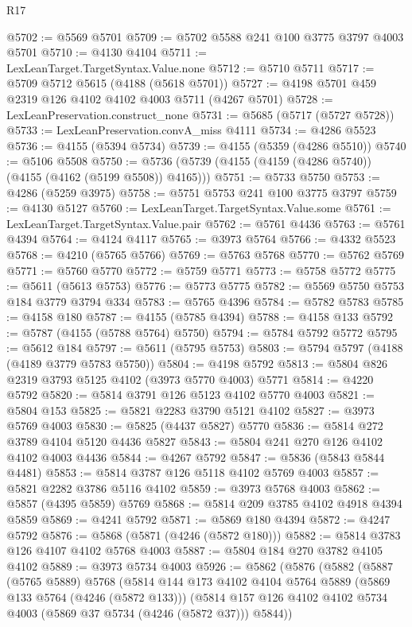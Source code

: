 \begin{lexlean}{R17}
\begin{coremodule}
@5702 := @5569 @5701
@5709 := @5702 @5588 @241 @100 @3775 @3797 @4003 @5701
@5710 := @4130 @4104
@5711 := LexLeanTarget.TargetSyntax.Value.none
@5712 := @5710 @5711
@5717 := @5709 @5712 @5615 (@4188 (@5618 @5701))
@5727 := @4198 @5701 @459 @2319 @126 @4102 @4102 @4003 @5711 (@4267 @5701)
@5728 := LexLeanPreservation.construct_none
@5731 := @5685 (@5717 (@5727 @5728))
@5733 := LexLeanPreservation.convA_miss @4111
@5734 := @4286 @5523
@5736 := @4155 (@5394 @5734)
@5739 := @4155 (@5359 (@4286 @5510))
@5740 := @5106 @5508
@5750 := @5736 (@5739 (@4155 (@4159 (@4286 @5740)) (@4155 (@4162 (@5199 @5508)) @4165)))
@5751 := @5733 @5750
@5753 := @4286 (@5259 @3975)
@5758 := @5751 @5753 @241 @100 @3775 @3797
@5759 := @4130 @5127
@5760 := LexLeanTarget.TargetSyntax.Value.some
@5761 := LexLeanTarget.TargetSyntax.Value.pair
@5762 := @5761 @4436
@5763 := @5761 @4394
@5764 := @4124 @4117
@5765 := @3973 @5764
@5766 := @4332 @5523
@5768 := @4210 (@5765 @5766)
@5769 := @5763 @5768
@5770 := @5762 @5769
@5771 := @5760 @5770
@5772 := @5759 @5771
@5773 := @5758 @5772
@5775 := @5611 (@5613 @5753)
@5776 := @5773 @5775
@5782 := @5569 @5750 @5753 @184 @3779 @3794 @334
@5783 := @5765 @4396
@5784 := @5782 @5783
@5785 := @4158 @180
@5787 := @4155 (@5785 @4394)
@5788 := @4158 @133
@5792 := @5787 (@4155 (@5788 @5764) @5750)
@5794 := @5784 @5792 @5772
@5795 := @5612 @184
@5797 := @5611 (@5795 @5753)
@5803 := @5794 @5797 (@4188 (@4189 @3779 @5783 @5750))
@5804 := @4198 @5792
@5813 := @5804 @826 @2319 @3793 @5125 @4102 (@3973 @5770 @4003) @5771
@5814 := @4220 @5792
@5820 := @5814 @3791 @126 @5123 @4102 @5770 @4003
@5821 := @5804 @153
@5825 := @5821 @2283 @3790 @5121 @4102
@5827 := @3973 @5769 @4003
@5830 := @5825 (@4437 @5827) @5770
@5836 := @5814 @272 @3789 @4104 @5120 @4436 @5827
@5843 := @5804 @241 @270 @126 @4102 @4102 @4003 @4436
@5844 := @4267 @5792
@5847 := @5836 (@5843 @5844 @4481)
@5853 := @5814 @3787 @126 @5118 @4102 @5769 @4003
@5857 := @5821 @2282 @3786 @5116 @4102
@5859 := @3973 @5768 @4003
@5862 := @5857 (@4395 @5859) @5769
@5868 := @5814 @209 @3785 @4102 @4918 @4394 @5859
@5869 := @4241 @5792
@5871 := @5869 @180 @4394
@5872 := @4247 @5792
@5876 := @5868 (@5871 (@4246 (@5872 @180)))
@5882 := @5814 @3783 @126 @4107 @4102 @5768 @4003
@5887 := @5804 @184 @270 @3782 @4105 @4102
@5889 := @3973 @5734 @4003
@5926 := @5862
    (@5876
      (@5882
        (@5887
          (@5765 @5889)
          @5768
          (@5814
            @144
            @173
            @4102
            @4104
            @5764
            @5889
            (@5869 @133 @5764 (@4246 (@5872 @133)))
            (@5814 @157 @126 @4102 @4102 @5734 @4003 (@5869 @37 @5734 (@4246 (@5872 @37))) @5844))

\end{coremodule}
\end{lexlean}
